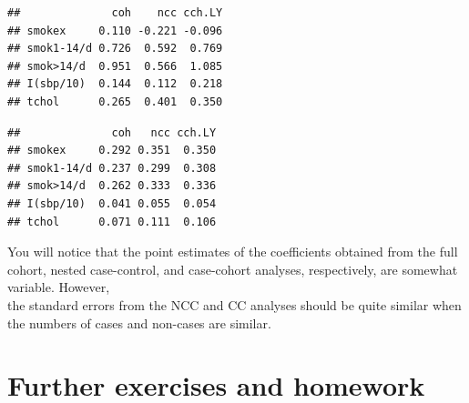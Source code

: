 \documentclass[
]{book}
\newenvironment{Shaded}{\begin{snugshade}}{\end{snugshade}}
\newcommand{\DecValTok}[1]{\textcolor[rgb]{0.00,0.00,0.81}{#1}}
\newcommand{\FunctionTok}[1]{\textcolor[rgb]{0.13,0.29,0.53}{\textbf{#1}}}
\newcommand{\NormalTok}[1]{#1}
\newcommand{\OtherTok}[1]{\textcolor[rgb]{0.56,0.35,0.01}{#1}}
\newcommand{\SpecialCharTok}[1]{\textcolor[rgb]{0.81,0.36,0.00}{\textbf{#1}}}
\theoremstyle{definition}
\theoremstyle{definition}
\theoremstyle{definition}
\theoremstyle{definition}
\theoremstyle{remark}
\begin{document}
\begin{verbatim}
##              coh    ncc cch.LY
## smokex     0.110 -0.221 -0.096
## smok1-14/d 0.726  0.592  0.769
## smok>14/d  0.951  0.566  1.085
## I(sbp/10)  0.144  0.112  0.218
## tchol      0.265  0.401  0.350
\end{verbatim}

\begin{Shaded}
\end{Shaded}

\begin{verbatim}
##              coh   ncc cch.LY
## smokex     0.292 0.351  0.350
## smok1-14/d 0.237 0.299  0.308
## smok>14/d  0.262 0.333  0.336
## I(sbp/10)  0.041 0.055  0.054
## tchol      0.071 0.111  0.106
\end{verbatim}

You will notice that the point estimates of the coefficients
obtained from the full cohort, nested case-control, and case-cohort analyses,
respectively, are somewhat variable. However,\\
the standard errors from the NCC and CC
analyses should be quite similar when the numbers of cases and non-cases are similar.

\section{Further exercises and homework}\label{further-exercises-and-homework}
\end{document}
